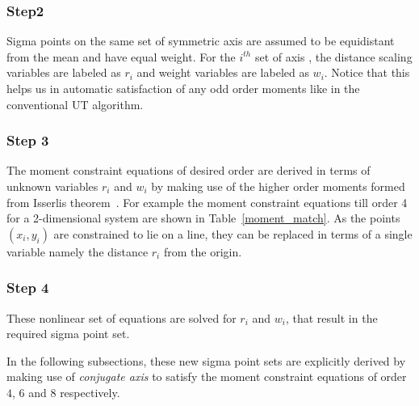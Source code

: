\documentclass[letterpaper, 10 pt, conference]{IEEEtran}  %
\begin{document}
\subsubsection*{Step2} Sigma points on the same set of symmetric axis  are assumed to be equidistant from the mean and have equal weight. For the $i^{th}$  set of axis , the distance scaling variables are labeled  as $r_i$ and weight variables are labeled as  $w_i$. Notice that this helps us in automatic satisfaction of any odd order moments like in the conventional UT algorithm.
\subsubsection*{Step 3} The moment constraint equations of desired order are derived in terms of unknown variables $r_i$ and $w_i$ by making use of the higher order moments formed from Isserlis theorem~\cite{isser}. For example the moment constraint equations till order 4 for a 2-dimensional system are shown in Table~\ref{moment_match}. As the points $(x_i,y_i)$ are constrained to lie on a line, they can be replaced in terms of a single variable namely the distance $r_i$ from the origin. 
\subsubsection*{Step 4} These nonlinear set of equations are solved for $r_i$ and $w_i$, that result in the required sigma point set.

In the following subsections, these new sigma point sets are explicitly derived by making use of \textit{conjugate axis} to satisfy the moment constraint equations of order $4$, $6$ and $8$ respectively. 
\end{document}
